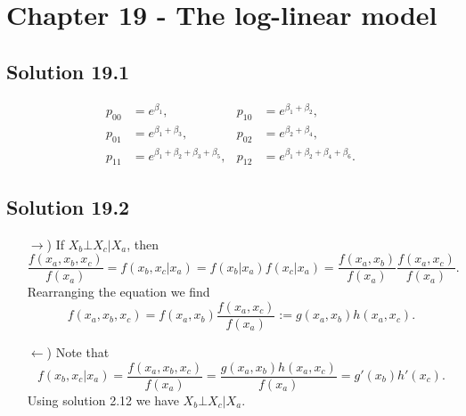 \section*{Chapter 19 - The log-linear model}

\subsection*{Solution 19.1}

\begin{align*}
    p_{00} &= e^{\beta_1}, & p_{10} &= e^{\beta_1 + \beta_2}, \\
    p_{01} &= e^{\beta_1 + \beta_3}, & p_{02} &= e^{\beta_2 + \beta_4}, \\
    p_{11} &= e^{\beta_1 + \beta_2 + \beta_3 + \beta_5}, & p_{12} &= e^{\beta_1 + \beta_2 + \beta_4 + \beta_6}.
\end{align*}


\subsection*{Solution 19.2}

\begin{itemize}
    \item[$\rightarrow$)] If $X_b \bot X_c | X_a$, then
        \begin{equation*}
            \frac{f(x_a, x_b, x_c)}{f(x_a)}
                = f(x_b, x_c| x_a) = f(x_b|x_a) f(x_c|x_a)
                = \frac{f(x_a, x_b)}{f(x_a)} \frac{f(x_a, x_c)}{f(x_a)}.
        \end{equation*}
        Rearranging the equation we find
        \begin{equation*}
            f(x_a, x_b, x_c) = f(x_a, x_b) \frac{f(x_a, x_c)}{f(x_a)}
                := g(x_a, x_b) h(x_a, x_c).
        \end{equation*}
    \item[$\leftarrow$)] Note that
        \begin{equation*}
            f(x_b, x_c|x_a) = \frac{f(x_a, x_b, x_c)}{f(x_a)}
                = \frac{g(x_a, x_b) h(x_a, x_c)}{f(x_a)}
                = g'(x_b) h'(x_c).
        \end{equation*}
        Using solution 2.12 we have $X_b \bot X_c | X_a$.
\end{itemize}
